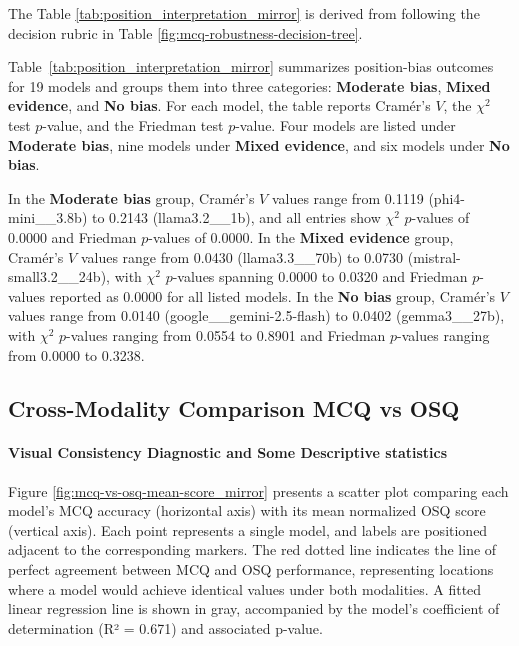 The Table \ref{tab:position_interpretation_mirror} is derived from following the decision rubric in Table \ref{fig:mcq-robustness-decision-tree}.

Table~\ref{tab:position_interpretation_mirror} summarizes position-bias outcomes for 19 models and groups them into three categories: \textbf{Moderate bias}, \textbf{Mixed evidence}, and \textbf{No bias}. For each model, the table reports Cram\'er's $V$, the $\chi^2$ test $p$-value, and the Friedman test $p$-value. Four models are listed under \textbf{Moderate bias}, nine models under \textbf{Mixed evidence}, and six models under \textbf{No bias}.

In the \textbf{Moderate bias} group, Cram\'er's $V$ values range from 0.1119 (phi4-mini\_\_3.8b) to 0.2143 (llama3.2\_\_1b), and all entries show $\chi^2$ $p$-values of 0.0000 and Friedman $p$-values of 0.0000. In the \textbf{Mixed evidence} group, Cram\'er's $V$ values range from 0.0430 (llama3.3\_\_70b) to 0.0730 (mistral-small3.2\_\_24b), with $\chi^2$ $p$-values spanning 0.0000 to 0.0320 and Friedman $p$-values reported as 0.0000 for all listed models. In the \textbf{No bias} group, Cram\'er's $V$ values range from 0.0140 (google\_\_gemini-2.5-flash) to 0.0402 (gemma3\_\_27b), with $\chi^2$ $p$-values ranging from 0.0554 to 0.8901 and Friedman $p$-values ranging from 0.0000 to 0.3238.



\clearpage
\subsection{Cross-Modality Comparison MCQ vs OSQ}\label{subsec:obj5_cross_modality_mirror}

\paragraph{Visual Consistency Diagnostic and Some Descriptive statistics}



Figure \ref{fig:mcq-vs-osq-mean-score_mirror} presents a scatter plot comparing each model's MCQ accuracy (horizontal axis) with its mean normalized OSQ score (vertical axis). Each point represents a single model, and labels are positioned adjacent to the corresponding markers. The red dotted line indicates the line of perfect agreement between MCQ and OSQ performance, representing locations where a model would achieve identical values under both modalities. A fitted linear regression line is shown in gray, accompanied by the model's coefficient of determination (R² = 0.671) and associated p-value.

